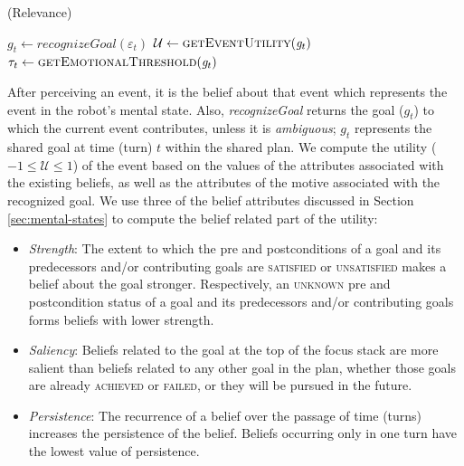 \documentclass{article}
\begin{document}
\begin{algorithm}
	\caption{(Relevance)}
	\label{alg:relevance}
	\begin{algorithmic}[1]
			\State $\mathit{g}_{t} \gets \textit{recognizeGoal}{(\varepsilon_t)}$
			\State $\mathcal{U} \gets \Call{getEventUtility}{\mathit{g}_{t}}$ 
			\State $\tau_{t} \gets \Call{getEmotionalThreshold}{\mathit{g}_{t}}$
				\State {}
			\Else
				\State {}
			\EndIf
		\EndFunction
	\end{algorithmic}
\end{algorithm}

\vspace*{-3mm}
After perceiving an event, it is the belief about that event which represents
the event in the robot's mental state. Also, \textit{recognizeGoal} returns
the goal ($g_{t}$) to which the current event contributes, unless it is
\textit{ambiguous}; $g_{t}$ represents the shared goal at time (turn) $t$ within
the shared plan. We compute the utility ($-1 \leq \mathcal{U} \leq 1$) of the
event based on the values of the attributes associated with the existing
beliefs, as well as the attributes of the motive associated with the recognized
goal. We use three of the belief attributes discussed in Section
\ref{sec:mental-states} to compute the belief related part of the utility:

\vspace*{-1mm}
\begin{itemize}[leftmargin=2pt]
  \setlength\itemsep{0.2mm}
  \item \textit{Strength}: The extent to which the pre and postconditions of a
  goal and its predecessors and/or contributing goals are \textsc{satisfied} or
  \textsc{unsatisfied} makes a belief about the goal stronger.
  Respectively, an \textsc{unknown} pre and postcondition status of a goal and
  its predecessors and/or contributing goals forms beliefs with lower strength.
  \item \textit{Saliency}: Beliefs related to the goal at the top of the focus
  stack are more salient than beliefs related to any other goal in the plan,
  whether those goals are already \textsc{achieved} or \textsc{failed}, or they
  will be pursued in the future.
  \item \textit{Persistence}: The recurrence of a belief over the passage of
  time (turns) increases the persistence of the belief. Beliefs occurring only
  in one turn have the lowest value of persistence.
\end{itemize}
\end{document}

